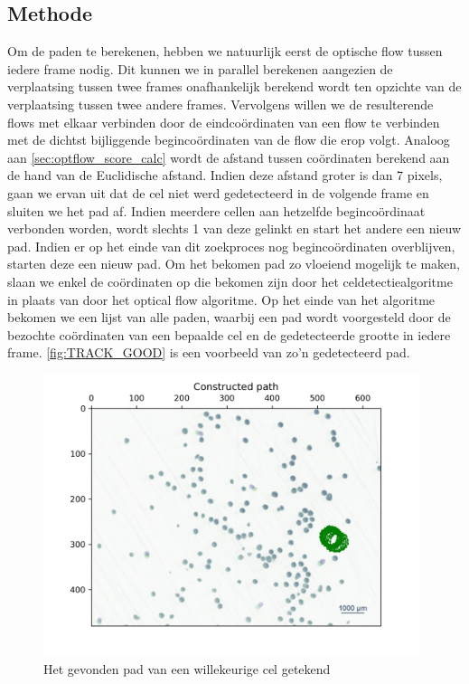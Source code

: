 \documentclass{article}
\begin{document}
\begin{multicols}{2}
\subsection{Methode}
Om de paden te berekenen, hebben we natuurlijk eerst de optische flow tussen iedere frame nodig. Dit kunnen we in parallel berekenen aangezien de verplaatsing tussen twee frames onafhankelijk berekend wordt ten opzichte van de verplaatsing tussen twee andere frames. Vervolgens willen we de resulterende flows met elkaar verbinden door de eindcoördinaten van een flow te verbinden met de dichtst bijliggende begincoördinaten van de flow die erop volgt. Analoog aan \autoref{sec:optflow_score_calc} wordt de afstand tussen coördinaten berekend aan de hand van de Euclidische afstand. Indien deze afstand groter is dan 7 pixels, gaan we ervan uit dat de cel niet werd gedetecteerd in de volgende frame en sluiten we het pad af. Indien meerdere cellen aan hetzelfde begincoördinaat verbonden worden, wordt slechts 1 van deze gelinkt en start het andere een nieuw pad. Indien er op het einde van dit zoekproces nog begincoördinaten overblijven, starten deze een nieuw pad. Om het bekomen pad zo vloeiend mogelijk te maken, slaan we enkel de coördinaten op die bekomen zijn door het celdetectiealgoritme in plaats van door het optical flow algoritme. Op het einde van het algoritme bekomen we een lijst van alle paden, waarbij een pad wordt voorgesteld door de bezochte coördinaten van een bepaalde cel en de gedetecteerde grootte in iedere frame. \autoref{fig:TRACK_GOOD} is een voorbeeld van zo'n gedetecteerd pad.
\begin{figure}[H]
\centering
\includegraphics[width=0.98\textwidth]{images/goodpath.jpg}
\caption{\label{fig:TRACK_GOOD}Het gevonden pad van een willekeurige cel getekend}
\end{figure}

\end{multicols}
\end{document}
